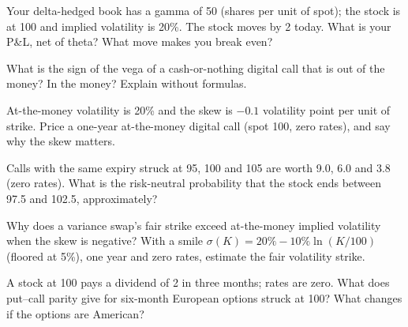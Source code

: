 \begin{interviewq}\label{iq:iv:options-and-derivatives:8}
Your delta-hedged book has a gamma of 50 (shares per unit of spot); the stock is at 100 and implied volatility is 20\%. The
stock moves by 2 today. What is your P\&L, net of theta? What move makes you break even?
\end{interviewq}

\begin{interviewq}\label{iq:iv:options-and-derivatives:9}
What is the sign of the vega of a cash-or-nothing digital call that is out of the money? In the money? Explain without
formulas.
\end{interviewq}

\begin{interviewq}\label{iq:iv:options-and-derivatives:10}
At-the-money volatility is 20\% and the skew is $-0.1$ volatility point per unit of strike. Price a one-year at-the-money
digital call (spot 100, zero rates), and say why the skew matters.
\end{interviewq}

\begin{interviewq}\label{iq:iv:options-and-derivatives:11}
Calls with the same expiry struck at 95, 100 and 105 are worth 9.0, 6.0 and 3.8 (zero rates). What is the risk-neutral
probability that the stock ends between 97.5 and 102.5, approximately?
\end{interviewq}

\begin{interviewq}\label{iq:iv:options-and-derivatives:12}
Why does a variance swap's fair strike exceed at-the-money implied volatility when the skew is negative? With a smile
$\sigma(K) = 20\% - 10\% \ln(K/100)$ (floored at 5\%), one year and zero rates, estimate the fair volatility strike.
\end{interviewq}

\begin{interviewq}\label{iq:iv:options-and-derivatives:13}
A stock at 100 pays a dividend of 2 in three months; rates are zero. What does put--call parity give for six-month
European options struck at 100? What changes if the options are American?
\end{interviewq}

